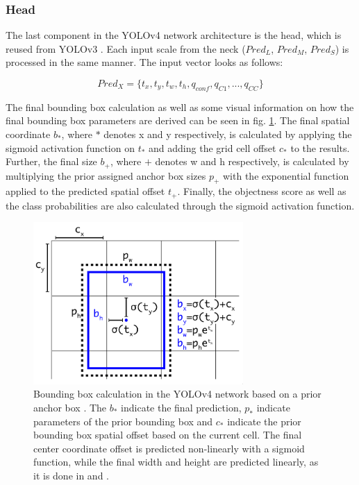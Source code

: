 \subsubsection{Head}
The last component in the \ac{YOLOv4} network architecture is the head, which is reused from YOLOv3 \cite{yolov3}.
Each input scale from the neck ($Pred_{L}$, $Pred_{M}$, $Pred_{S}$) is processed in the same manner.
The input vector looks as follows:

\begin{equation}
    Pred_{X} = \{t_x, t_y, t_w, t_h, q_{conf}, q_{C1},...,q_{CC}\}
\end{equation}

The final bounding box calculation as well as some visual information on how the final bounding box parameters are derived can be seen in fig. \ref{fig:bbox_calculation}.
The final spatial coordinate $b_*$, where $*$ denotes x and y respectively, is calculated by applying the sigmoid activation function on $t_*$ and adding the grid cell offset $c_*$ to the results.
Further, the final size $b_+$, where $+$ denotes w and h respectively, is calculated by multiplying the prior assigned anchor box sizes $p_+$ with the exponential function applied to the predicted spatial offset $t_+$.
Finally, the objectness score as well as the class probabilities are also calculated through the sigmoid activation function.

\begin{figure}
\begin{center}
    \includegraphics[width=8cm]{imgs/bbox_calculation.png}
    \caption{Bounding box calculation in the YOLOv4 network based on a prior anchor box \cite{yolov2}. The $b_*$ indicate the final prediction, $p_*$ indicate parameters of the prior bounding box and $c_*$ indicate the prior bounding box spatial offset based on the current cell. The final center coordinate offset is predicted non-linearly with a sigmoid function, while the final width and height are predicted linearly, as it is done in \cite{fast_rcnn} and \cite{faster_rcnn}.}
    \label{fig:bbox_calculation}
\end{center}
\end{figure}

